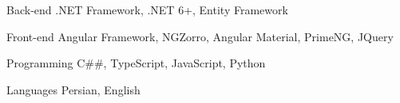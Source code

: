 

\begin{cvskills}

  \cvskill
    {Back-end} %
    {.NET Framework, .NET 6+, Entity Framework} %

  \cvskill
    {Front-end} %
    {Angular Framework, NGZorro, Angular Material, PrimeNG, JQuery} %

  \cvskill
    {Programming} %
    {C##, TypeScript, JavaScript, Python} %

  \cvskill
    {Languages} %
    {Persian, English} %

\end{cvskills}
